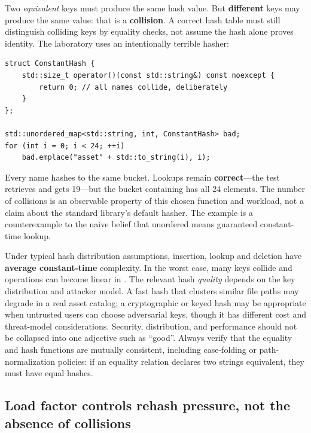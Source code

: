 Two \emph{equivalent} keys must produce the same hash value. But \textbf{different} keys may produce the same value: that is a \textbf{collision}. A correct hash table must still distinguish colliding keys by equality checks, not assume the hash alone proves identity. The laboratory uses an intentionally terrible hasher:

\begin{verbatim}
struct ConstantHash {
    std::size_t operator()(const std::string&) const noexcept {
        return 0; // all names collide, deliberately
    }
};

std::unordered_map<std::string, int, ConstantHash> bad;
for (int i = 0; i < 24; ++i)
    bad.emplace("asset" + std::to_string(i), i);
\end{verbatim}

Every name hashes to the same bucket. Lookups remain \textbf{correct}---the test retrieves  and gets 19---but the bucket containing  has all 24 elements. The number of collisions is an observable property of this chosen function and workload, not a claim about the standard library's default hasher. The example is a counterexample to the naive belief that unordered means guaranteed constant-time lookup.

Under typical hash distribution assumptions, insertion, lookup and deletion have \textbf{average constant-time} complexity. In the worst case, many keys collide and operations can become linear in . The relevant hash \emph{quality} depends on the key distribution and attacker model. A fast hash that clusters similar file paths may degrade in a real asset catalog; a cryptographic or keyed hash may be appropriate when untrusted users can choose adversarial keys, though it has different cost and threat-model considerations. Security, distribution, and performance should not be collapsed into one adjective such as ``good''. Always verify that the equality and hash functions are mutually consistent, including case-folding or path-normalization policies: if an equality relation declares two strings equivalent, they must have equal hashes.

\subsection{Load factor controls rehash pressure, not the absence of collisions}\label{01-foundations-i-ch006-load-factor-controls-rehash-pressure-not-the-absence-of-collisions}

